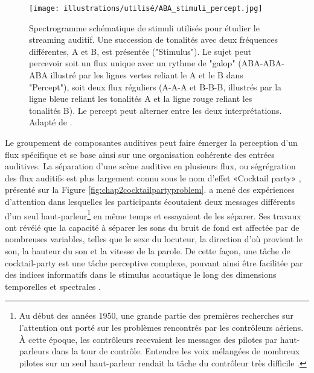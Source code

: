\begin{figure*}[!t]
\center
\texttt{[image: illustrations/utilisé/ABA\_stimuli\_percept.jpg]}
\caption[Paradigme de streaming auditif ABA]{Spectrogramme schématique de stimuli utilisés pour étudier le streaming auditif. Une succession de tonalités avec deux fréquences différentes, A et B, est présentée ("Stimulus"). Le sujet peut percevoir soit un flux unique avec un rythme de "galop" (ABA-ABA-ABA illustré par les lignes vertes reliant le A et le B dans "Percept"), soit deux flux réguliers (A-A-A et B-B-B, illustrés par la ligne bleue reliant les tonalités A et la ligne rouge reliant les tonalités B). Le percept peut alterner entre les deux interprétations. Adapté de \cite{schwartz2012multistability}.}
\label{fig:chap2paradigmestreamingauditifABA}
\end{figure*}

Le groupement de composantes auditives peut faire émerger la perception d'un flux spécifique et se base ainsi sur une organisation cohérente des entrées auditives. 
La séparation d'une scène auditive en plusieurs flux, ou ségrégration des flux auditifs est plus largement connu sous le nom d'effet «Cocktail party» \citep{cherry1953some}, présenté sur la Figure \ref{fig:chap2cocktailpartyproblem}.
\cite{cherry1953some} a mené des expériences d'attention dans lesquelles les participants écoutaient deux messages différents d'un seul haut-parleur\footnote{Au début des années 1950, une grande partie des premières recherches sur l'attention ont porté sur les problèmes rencontrés par les contrôleurs aériens. 
À cette époque, les contrôleurs recevaient les messages des pilotes par haut-parleurs dans la tour de contrôle. 
Entendre les voix mélangées de nombreux pilotes sur un seul haut-parleur rendait la tâche du contrôleur très difficile \citep{sorkin1983human}.}
 en même temps et essayaient de les séparer. 
Ses travaux ont révélé que la capacité à séparer les sons du bruit de fond est affectée par de nombreuses variables, telles que le sexe du locuteur, la direction d'où provient le son, la hauteur du son et la vitesse de la parole.
De cette façon, une tâche de cocktail-party est une tâche perceptive complexe, pouvant ainsi être facilitée par des indices informatifs dans le stimulus acoustique le long des dimensions temporelles et spectrales \citep{akram2015neural}. 

